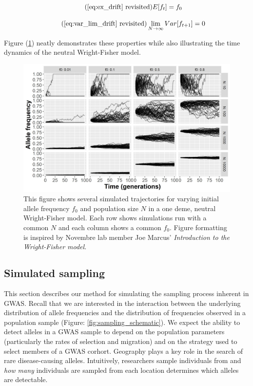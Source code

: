 \begin{equation}
    \tag{\ref{eq:ex_drift} revisited}
    E[f_t] = f_0
\end{equation}

\begin{equation}
    \tag{\ref{eq:var_lim_drift} revisited}
    \lim_{N \to \infty} Var[f_{t+1}] = 0
\end{equation}


Figure (\ref{fig:neutral_wf}) neatly demonstrates these properties while also illustrating the time dynamics of the neutral Wright-Fisher model. 


\begin{figure}[h]
    \centering
    \includegraphics[scale=0.8]{img/neutral_wf.jpg}
    \caption{This figure shows several simulated trajectories for varying initial allele frequency $f_0$ and population size $N$ in a one deme, neutral Wright-Fisher model. Each row shows simulations run with a common $N$ and each column shows a common $f_0$. Figure formatting is inspired by Novembre lab member Joe Marcus' \textit{Introduction to the Wright-Fisher model}.\cite{marcus_2016}}
    \label{fig:neutral_wf}
\end{figure}




\newpage
\subsection{Simulated sampling}
This section describes our method for simulating the sampling process inherent in GWAS. Recall that we are interested in the interaction between the underlying distribution of allele frequencies and the distribution of frequencies observed in a population sample (Figure: \ref{fig:sampling_schematic}). We expect the ability to detect alleles in a GWAS sample to depend on the population parameters (particularly the rates of selection and migration) and on the strategy used to select members of a GWAS corhort. Geography plays a key role in the search of rare disease-causing alleles. Intuitively,  researchers sample individuals from and \textit{how many} individuals are sampled from each location determines which alleles are detectable.


